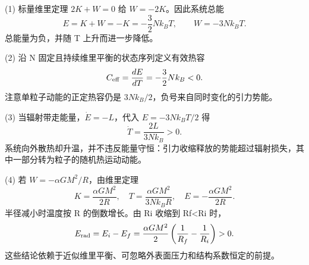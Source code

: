 (1) 标量维里定理 \(2K+W=0\) 给 \(W=-2K\)。因此系统总能
\[
E=K+W=-K=-\frac32Nk_BT,\qquad W=-3Nk_BT.
\]
总能量为负，并随 T 上升而进一步降低。

(2) 沿 N 固定且持续维里平衡的状态序列定义有效热容
\[
C_{\rm eff}=\frac{dE}{dT}=-\frac32Nk_B<0.
\]
注意单粒子动能的正定热容仍是 \(3Nk_B/2\)，负号来自同时变化的引力势能。

(3) 当辐射带走能量，\(\dot E=-L\)，代入 \(E=-3Nk_BT/2\) 得
\[
\dot T=\frac{2L}{3Nk_B}>0.
\]
系统向外散热却升温，并不违反能量守恒：引力收缩释放的势能超过辐射损失，其中一部分转为粒子的随机热运动动能。

(4) 若 \(W=-\alpha GM^2/R\)，由维里定理
\[
K=\frac{\alpha GM^2}{2R},\quad
T=\frac{\alpha GM^2}{3Nk_BR},\quad
E=-\frac{\alpha GM^2}{2R}.
\]
半径减小时温度按 R 的倒数增长。由 Ri 收缩到 Rf<Ri 时，
\[
E_{\rm rad}=E_i-E_f=
\frac{\alpha GM^2}{2}\left(\frac1{R_f}-\frac1{R_i}\right)>0.
\]
这些结论依赖于近似维里平衡、可忽略外表面压力和结构系数恒定的前提。
